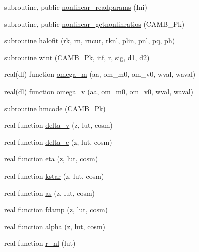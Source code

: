 \begin{DoxyCompactItemize}
\item 
subroutine, public \mbox{\hyperlink{namespacenonlinear_ada72232da7963dc507bfa2f4d346e7ec}{nonlinear\+\_\+readparams}} (Ini)
\item 
subroutine, public \mbox{\hyperlink{namespacenonlinear_a0ed6b8f43af3b8a2cb369df5c247ca1f}{nonlinear\+\_\+getnonlinratios}} (C\+A\+M\+B\+\_\+\+Pk)
\item 
subroutine \mbox{\hyperlink{namespacenonlinear_a76e8738685b7ce5757290a6441d5e850}{halofit}} (rk, rn, rncur, rknl, plin, pnl, pq, ph)
\item 
subroutine \mbox{\hyperlink{namespacenonlinear_acf30963fec3b82503de7d079f4091461}{wint}} (C\+A\+M\+B\+\_\+\+Pk, itf, r, sig, d1, d2)
\item 
real(dl) function \mbox{\hyperlink{namespacenonlinear_a114a4d8047f3679297cc7b1c216d6517}{omega\+\_\+m}} (aa, om\+\_\+m0, om\+\_\+v0, wval, waval)
\item 
real(dl) function \mbox{\hyperlink{namespacenonlinear_ab10a9f1bd96361d1619be7e609ce6cb5}{omega\+\_\+v}} (aa, om\+\_\+m0, om\+\_\+v0, wval, waval)
\item 
subroutine \mbox{\hyperlink{namespacenonlinear_acf9ab8f72085502eea51c43dcf5ad67e}{hmcode}} (C\+A\+M\+B\+\_\+\+Pk)
\item 
real function \mbox{\hyperlink{namespacenonlinear_a73fccef372213a59eed00701677d1cdf}{delta\+\_\+v}} (z, lut, cosm)
\item 
real function \mbox{\hyperlink{namespacenonlinear_a927f840ecd0f2086eefba9d7220e3279}{delta\+\_\+c}} (z, lut, cosm)
\item 
real function \mbox{\hyperlink{namespacenonlinear_a96b424e6fa8e55242e57bbd2e607a70d}{eta}} (z, lut, cosm)
\item 
real function \mbox{\hyperlink{namespacenonlinear_a0e7bfac54def3a760a789b01501ee54b}{kstar}} (z, lut, cosm)
\item 
real function \mbox{\hyperlink{namespacenonlinear_a8a288f085ec2814b9d936eaff5987c9a}{as}} (z, lut, cosm)
\item 
real function \mbox{\hyperlink{namespacenonlinear_aea62820c73faaebffe8f3a0dce00a711}{fdamp}} (z, lut, cosm)
\item 
real function \mbox{\hyperlink{namespacenonlinear_a31039036014feacf6b5001228cbecf2d}{alpha}} (z, lut, cosm)
\item 
real function \mbox{\hyperlink{namespacenonlinear_a9fdd5c2093c44b1f49fdaafaa3e568da}{r\+\_\+nl}} (lut)
\item 

\end{DoxyCompactItemize}

